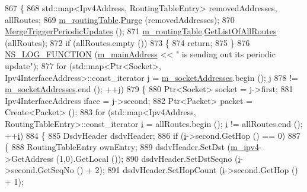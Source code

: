 \begin{DoxyCode}
867 \{
868   std::map<Ipv4Address, RoutingTableEntry> removedAddresses, allRoutes;
869   \hyperlink{classns3_1_1dsdv_1_1RoutingProtocol_acc4cee466c2591e35f508ce58097a00e}{m\_routingTable}.\hyperlink{classns3_1_1dsdv_1_1RoutingTable_ad4e2b213772381511453c5ec8c968e68}{Purge} (removedAddresses);
870   \hyperlink{classns3_1_1dsdv_1_1RoutingProtocol_afcf1903d16fb9d303805fbe07986bb06}{MergeTriggerPeriodicUpdates} ();
871   \hyperlink{classns3_1_1dsdv_1_1RoutingProtocol_acc4cee466c2591e35f508ce58097a00e}{m\_routingTable}.\hyperlink{classns3_1_1dsdv_1_1RoutingTable_af980697df819d8a00ee8782c705e3dac}{GetListOfAllRoutes} (allRoutes);
872   \textcolor{keywordflow}{if} (allRoutes.empty ())
873     \{
874       \textcolor{keywordflow}{return};
875     \}
876   \hyperlink{log-macros-disabled_8h_a90b90d5bad1f39cb1b64923ea94c0761}{NS\_LOG\_FUNCTION} (\hyperlink{classns3_1_1dsdv_1_1RoutingProtocol_af7cb076b88eb5ff20a1c146e3f5849f6}{m\_mainAddress} << \textcolor{stringliteral}{" is sending out its periodic update"});
877   \textcolor{keywordflow}{for} (std::map<Ptr<Socket>, Ipv4InterfaceAddress>::const\_iterator j = 
      \hyperlink{classns3_1_1dsdv_1_1RoutingProtocol_a9f3be507604655079b145f063cf036fd}{m\_socketAddresses}.begin (); j
878        != \hyperlink{classns3_1_1dsdv_1_1RoutingProtocol_a9f3be507604655079b145f063cf036fd}{m\_socketAddresses}.end (); ++j)
879     \{
880       Ptr<Socket> socket = j->first;
881       Ipv4InterfaceAddress iface = j->second;
882       Ptr<Packet> packet = Create<Packet> ();
883       \textcolor{keywordflow}{for} (std::map<Ipv4Address, RoutingTableEntry>::const\_iterator \hyperlink{bernuolliDistribution_8m_a6f6ccfcf58b31cb6412107d9d5281426}{i} = allRoutes.begin (); 
      \hyperlink{bernuolliDistribution_8m_a6f6ccfcf58b31cb6412107d9d5281426}{i} != allRoutes.end (); ++\hyperlink{bernuolliDistribution_8m_a6f6ccfcf58b31cb6412107d9d5281426}{i})
884         \{
885           DsdvHeader dsdvHeader;
886           \textcolor{keywordflow}{if} (\hyperlink{bernuolliDistribution_8m_a6f6ccfcf58b31cb6412107d9d5281426}{i}->second.GetHop () == 0)
887             \{
888               RoutingTableEntry ownEntry;
889               dsdvHeader.SetDst (\hyperlink{classns3_1_1dsdv_1_1RoutingProtocol_a955477c7f38e64762a264c24e3762af6}{m\_ipv4}->GetAddress (1,0).GetLocal ());
890               dsdvHeader.SetDstSeqno (\hyperlink{bernuolliDistribution_8m_a6f6ccfcf58b31cb6412107d9d5281426}{i}->second.GetSeqNo () + 2);
891               dsdvHeader.SetHopCount (\hyperlink{bernuolliDistribution_8m_a6f6ccfcf58b31cb6412107d9d5281426}{i}->second.GetHop () + 1);

\end{DoxyCode}
